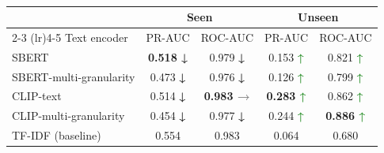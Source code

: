 \documentclass{article}
\begin{document}
\setcounter{table}{5}
\begin{table}[t]
\centering
\small
\setlength{\tabcolsep}{5pt}
\renewcommand{\arraystretch}{1.15}
\begin{threeparttable}
\caption{}
\label{tab:innov_text}
\begin{tabular}{l c c c c}
\toprule
 & \multicolumn{2}{c}{Seen} & \multicolumn{2}{c}{Unseen} \\
\cmidrule(lr){2-3} \cmidrule(lr){4-5}
Text encoder & {PR-AUC} & {ROC-AUC} & {PR-AUC} & {ROC-AUC} \\
\midrule
SBERT & \bfseries 0.518 \textcolor{BrickRed}{\textbf{↓}} & 0.979 \textcolor{BrickRed}{\textbf{↓}} & 0.153 \textcolor{ForestGreen}{\textbf{↑}} & 0.821 \textcolor{ForestGreen}{\textbf{↑}} \\
SBERT-multi-granularity & 0.473 \textcolor{BrickRed}{\textbf{↓}} & 0.976 \textcolor{BrickRed}{\textbf{↓}} & 0.126 \textcolor{ForestGreen}{\textbf{↑}} & 0.799 \textcolor{ForestGreen}{\textbf{↑}} \\
CLIP-text & 0.514 \textcolor{BrickRed}{\textbf{↓}} & \bfseries 0.983 \textcolor{gray}{\textbf{→}} & \bfseries 0.283 \textcolor{ForestGreen}{\textbf{↑}} & 0.862 \textcolor{ForestGreen}{\textbf{↑}} \\
CLIP-multi-granularity & 0.454 \textcolor{BrickRed}{\textbf{↓}} & 0.977 \textcolor{BrickRed}{\textbf{↓}} & 0.244 \textcolor{ForestGreen}{\textbf{↑}} & \bfseries 0.886 \textcolor{ForestGreen}{\textbf{↑}} \\
\midrule
TF-IDF (baseline) & 0.554 & 0.983 & 0.064 & 0.680 \\
\bottomrule
\end{tabular}
\end{threeparttable}
\end{table}
\end{document}
